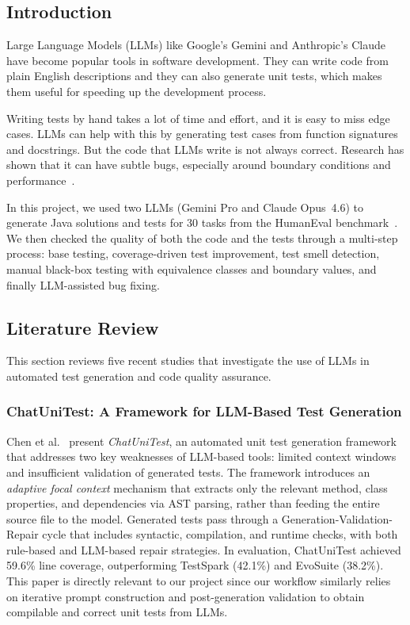 \documentclass[12pt, a4paper]{article}
\begin{document}
\subsection{Introduction}

Large Language Models (LLMs) like Google's Gemini and Anthropic's Claude have become popular tools in software development. They can write code from plain English descriptions and they can also generate unit tests, which makes them useful for speeding up the development process.

Writing tests by hand takes a lot of time and effort, and it is easy to miss edge cases. LLMs can help with this by generating test cases from function signatures and docstrings. But the code that LLMs write is not always correct. Research has shown that it can have subtle bugs, especially around boundary conditions and performance~\cite{chatunitest, mutation_meta}.

In this project, we used two LLMs (Gemini Pro and Claude Opus~4.6) to generate Java solutions and tests for 30 tasks from the HumanEval benchmark~\cite{humaneval}. We then checked the quality of both the code and the tests through a multi-step process: base testing, coverage-driven test improvement, test smell detection, manual black-box testing with equivalence classes and boundary values, and finally LLM-assisted bug fixing.

\subsection{Literature Review}
This section reviews five recent studies that investigate the use of LLMs in automated test generation and code quality assurance.

\subsubsection{ChatUniTest: A Framework for LLM-Based Test Generation}
Chen et al.~\cite{chatunitest} present \textit{ChatUniTest}, an automated unit test generation framework that addresses two key weaknesses of LLM-based tools: limited context windows and insufficient validation of generated tests. The framework introduces an \textit{adaptive focal context} mechanism that extracts only the relevant method, class properties, and dependencies via AST parsing, rather than feeding the entire source file to the model. Generated tests pass through a Generation-Validation-Repair cycle that includes syntactic, compilation, and runtime checks, with both rule-based and LLM-based repair strategies. In evaluation, ChatUniTest achieved 59.6\% line coverage, outperforming TestSpark (42.1\%) and EvoSuite (38.2\%). This paper is directly relevant to our project since our workflow similarly relies on iterative prompt construction and post-generation validation to obtain compilable and correct unit tests from LLMs.
\end{document}
